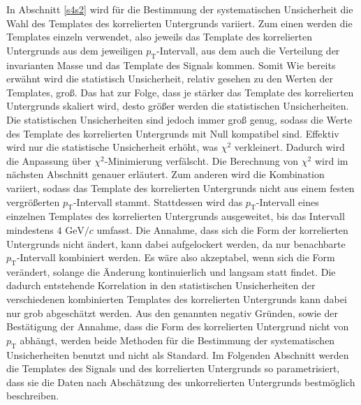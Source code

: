 In Abschnitt \ref{s4s2} wird für die Bestimmung der systematischen Unsicherheit die Wahl des Templates des korrelierten Untergrunds variiert.
\newline
Zum einen werden die Templates einzeln verwendet, also jeweils das Template des korrelierten Untergrunds aus dem jeweiligen $p_\text{T}$-Intervall, aus dem auch die Verteilung der invarianten Masse und das Template des Signals kommen.
Somit 
Wie bereits erwähnt wird die statistisch Unsicherheit, relativ gesehen zu den Werten der Templates, groß.
Das hat zur Folge, dass je stärker das Template des korrelierten Untergrunds skaliert wird, desto größer werden die statistischen Unsicherheiten.
Die statistischen Unsicherheiten sind jedoch immer groß genug, sodass die Werte des Template des korrelierten Untergrunds mit Null kompatibel sind.
Effektiv wird nur die statistische Unsicherheit erhöht, was $\chi^{2}$ verkleinert.
Dadurch wird die Anpassung über $\chi^{2}$-Minimierung verfälscht.
Die Berechnung von $\chi^{2}$ wird im nächsten Abschnitt genauer erläutert.
\newline
Zum anderen wird die Kombination variiert, sodass das Template des korrelierten Untergrunds nicht aus einem festen vergrößerten $p_\text{T}$-Intervall stammt.
Stattdessen wird das $p_\text{T}$-Intervall eines einzelnen Templates des korrelierten Untergrunds ausgeweitet, bis das Intervall mindestens $4\text{ GeV}/c$ umfasst.
Die Annahme, dass sich die Form der korrelierten Untergrunds nicht ändert, kann dabei aufgelockert werden, da nur benachbarte $p_\text{T}$-Intervall kombiniert werden.
Es wäre also akzeptabel, wenn sich die Form verändert, solange die Änderung kontinuierlich und langsam statt findet.
Die dadurch entstehende Korrelation in den statistischen Unsicherheiten der verschiedenen kombinierten Templates des korrelierten Untergrunds kann dabei nur grob abgeschätzt werden. 
\newline
Aus den genannten negativ Gründen, sowie der Bestätigung der Annahme, dass die Form des korrelierten Untergrund nicht von $p_\text{T}$ abhängt, werden beide Methoden für die Bestimmung der systematischen Unsicherheiten benutzt und nicht als Standard.
\newline
Im Folgenden Abschnitt werden die Templates des Signals und des korrelierten Untergrunds so parametrisiert, dass sie die Daten nach Abschätzung des unkorrelierten Untergrunds bestmöglich beschreiben.